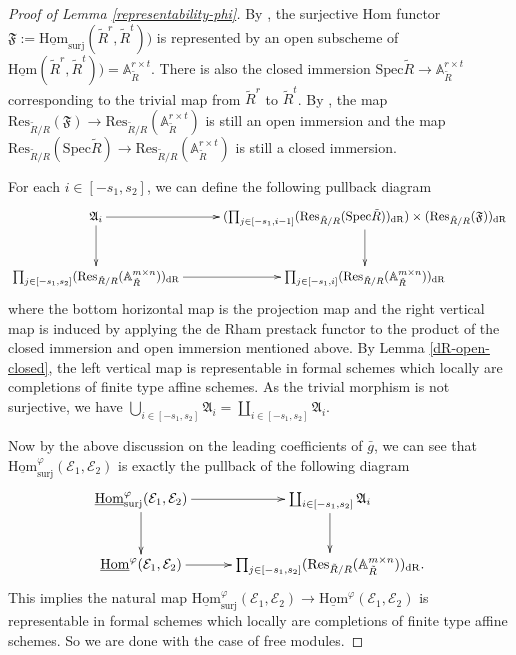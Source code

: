 \documentclass[10pt]{article}
\numberwithin{equation}{section}
\newcommand{\frakA}{{\mathfrak A}}
\newcommand{\frakF}{{\mathfrak F}}
\newcommand{\bA}{{\mathbb A}}
\newcommand{\calE}{{\mathcal E}}
\newcommand{\Hom}{{\mathrm{Hom}}}           %
\newcommand{\Spec}{{\mathrm{Spec}}}         %
\newcommand{\dR}{{\mathrm{dR}}}             %
\newcommand{\surj}{\mathrm{surj}}
\newcommand{\Res}{\mathrm{Res}}
\begin{document}
\begin{proof}[Proof of Lemma \ref{representability-phi}]
By \cite[\href{https://stacks.math.columbia.edu/tag/09TP}{Tag 09TP}]{stacks-project}, the surjective Hom functor $\frakF:=\underline\Hom_{\surj}(\tilde R^r,\tilde R^t))$ is represented by an open subscheme of $\underline\Hom(\tilde R^r,\tilde R^t))=\bA_{\tilde R}^{r\times t}$. There is also the closed immersion $\Spec\tilde R\to \bA_{\tilde R}^{r\times t}$ corresponding to the trivial map from $\tilde R^r$ to $\tilde R^t$. By \cite[Proposition 7.6/2]{BLR12}, the map $\Res_{\tilde R/R}(\frakF)\to \Res_{\tilde R/R}(\bA_{\tilde R}^{r\times t})$ is still an open immersion and the map $\Res_{\tilde R/R}(\Spec\tilde R)\to \Res_{\tilde R/R}(\bA_{\tilde R}^{r\times t})$ is still a closed immersion.

For each $i\in [-s_1,s_2]$, we can define the following pullback diagram
\begin{equation}
    \xymatrix@=1cm{
   \frakA_i\ar[d]\ar[r] & (\prod_{j\in[-s_1,i-1]}(\Res_{\tilde R/R}(\Spec\tilde R))_{\dR})\times (\Res_{\tilde R/R}(\frakF))_{\dR}\ar[d] \\
    \prod_{j\in [-s_1,s_2]} (\Res_{\tilde R/R}(\bA_{\tilde R}^{m\times n}))_{\dR}\ar[r]^{{}} & \prod_{j\in [-s_1,i]} (\Res_{\tilde R/R}(\bA_{\tilde R}^{m\times n}))_{\dR}
    }
\end{equation}
where the bottom horizontal map is the projection map and the right vertical map is induced by applying the de Rham prestack functor to the product of the closed immersion and open immersion mentioned above. By Lemma \ref{dR-open-closed}, the left vertical map is representable in formal schemes which locally are completions of finite type affine schemes. As the trivial morphism is not surjective, we have $\bigcup_{i\in [-s_1,s_2]} \frakA_i=\coprod_{i\in [-s_1,s_2]} \frakA_i$.

Now by the above discussion on the leading coefficients of $\bar g$, we can see that $\underline\Hom_{\surj}^{\varphi}(\calE_1,\calE_2)$ is exactly the pullback of the following diagram
\begin{equation}
    \xymatrix@=1cm{
    \underline\Hom_{\surj}^{\varphi}(\calE_1,\calE_2)\ar[d]\ar[r] &\coprod_{i\in[-s_1,s_2]}\frakA_i\ar[d]\\
    \underline\Hom^{\varphi}(\calE_1,\calE_2)\ar[r] & \prod_{j\in [-s_1,s_2]} (\Res_{\tilde R/R}(\bA_{\tilde R}^{m\times n}))_{\dR}.
    }
\end{equation}
This implies the natural map $\underline\Hom_{\surj}^{\varphi}(\calE_1,\calE_2)\to  \underline\Hom^{\varphi}(\calE_1,\calE_2)$ is representable in formal schemes which locally are completions of finite type affine schemes. So we are done with the case of free modules.


\end{proof}
\end{document}
